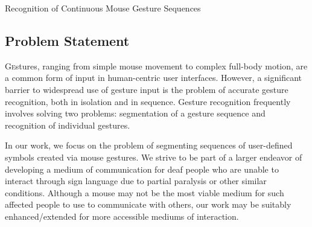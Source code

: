 \documentclass[twoside]{article}
\begin{document}
\centerline{Recognition of Continuous Mouse Gesture Sequences}
\normalsize


\begin{multicols}{2} %

\section{Problem Statement}

\lettrine[nindent=0em,lines=2]{G}estures, ranging from simple mouse movement to
complex full-body motion, are a common form of input in human-centric user
interfaces\cite{mitra_gesture_2007}. However, a significant barrier to
widespread use of gesture input is the problem of accurate gesture recognition,
both in isolation and in sequence. Gesture recognition frequently involves
solving two problems: segmentation of a gesture sequence and recognition of
individual gestures.

In our work, we focus on the problem of segmenting sequences of user-defined
symbols created via mouse gestures. We strive to be part of a larger endeavor of
developing a medium of communication for deaf people who are unable to interact
through sign language due to partial paralysis or other similar conditions.
Although a mouse may not be the most viable medium for such affected people to
use to communicate with others, our work may be suitably enhanced/extended for
more accessible mediums of interaction.

\begin{comment}
Our work addresses one part of the larger problem of recognition of custom handwritten symbols, which according to law enforcement is a common medium of communication among gangs\cite{lyddane_donald_united_2006}. To our
knowledge, designing a general-purpose ``symbol'' recognizer has not been addressed in the literature.
\end{comment}

\end{multicols}
\end{document}
